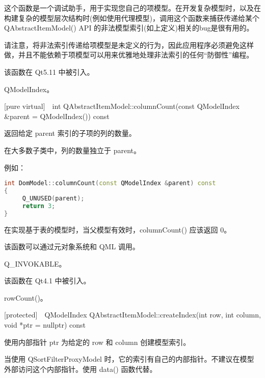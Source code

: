 \begin{notice}
这个函数是一个调试助手，用于实现您自己的项模型。在开发复杂模型时，以及在构建复杂的模型层次结构时(例如使用代理模型)，调用这个函数来捕获传递给某个 QAbstractItemModel() API 的非法模型索引(如上定义)相关的bug是很有用的。
\end{notice}

\begin{warning}
请注意，将非法索引传递给项模型是未定义的行为，因此应用程序必须避免这样做，并且不能依赖于项模型可以用来优雅地处理非法索引的任何“防御性”编程。
\end{warning}


该函数在 Qt5.11 中被引入。

\begin{seeAlso}
QModelIndex。
\end{seeAlso}

[pure virtual] int QAbstractItemModel::columnCount(const QModelIndex \&parent = QModelIndex()) const

返回给定 parent 索引的子项的列的数量。

在大多数子类中，列的数量独立于 parent。

例如：

\begin{lstlisting}[language=C++]
int DomModel::columnCount(const QModelIndex &parent) const
{
     Q_UNUSED(parent);
     return 3;
}
\end{lstlisting}

\begin{notice}
在实现基于表的模型时，当父模型有效时，columnCount() 应该返回 0。
\end{notice}

\begin{notice}
该函数可以通过元对象系统和 QML 调用。
\end{notice}

\begin{seeAlso}
Q\_INVOKABLE。
\end{seeAlso}

该函数在 Qt4.1 中被引入。

\begin{seeAlso}
rowCount()。
\end{seeAlso}

[protected] QModelIndex QAbstractItemModel::createIndex(int row, int column, void *ptr = nullptr) const

使用内部指针 ptr 为给定的 row 和 column 创建模型索引。

当使用 QSortFilterProxyModel 时，它的索引有自己的内部指针。不建议在模型外部访问这个内部指针。使用 data() 函数代替。

